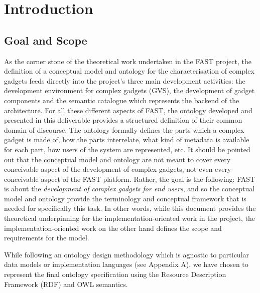 \documentclass{article}
\begin{document}
\listoftables
\listoffigures
\lstlistoflistings

\cleardoublepage

\clearpage

\section{Introduction} %
\label{sec:introduction}

\subsection{Goal and Scope} %
\label{sub:goal_and_scope}

As the corner stone of the theoretical work undertaken in the FAST project, the definition of a conceptual model and ontology for the characterisation of complex gadgets feeds directly into the project's three main development activities: the development environment for complex gadgets (GVS), the development of gadget components and the semantic catalogue which represents the backend of the architecture. For all these different aspects of FAST, the ontology developed and presented in this deliverable provides a structured definition of their common domain of discourse. The ontology formally defines the parts which a complex gadget is made of, how the parts interrelate, what kind of metadata is available for each part, how users of the system are represented, etc. It should be pointed out that the conceptual model and ontology are not meant to cover every conceivable aspect of the development of complex gadgets, not even every conceivable aspect of the FAST platform. Rather, the goal is the following: FAST is about the \emph{development of complex gadgets for end users}, and so the conceptual model and ontology provide the terminology and conceptual framework that is needed for specifically this task. In other words, while this document provides the theoretical underpinning for the implementation-oriented work in the project, the implementation-oriented work on the other hand defines the scope and requirements for the model.

While following an ontology design methodology which is agnostic to particular data models or implementation languages (see Appendix A), we have chosen to represent the final ontology specification using the Resource Description Framework (RDF) and OWL semantics.
\end{document}
